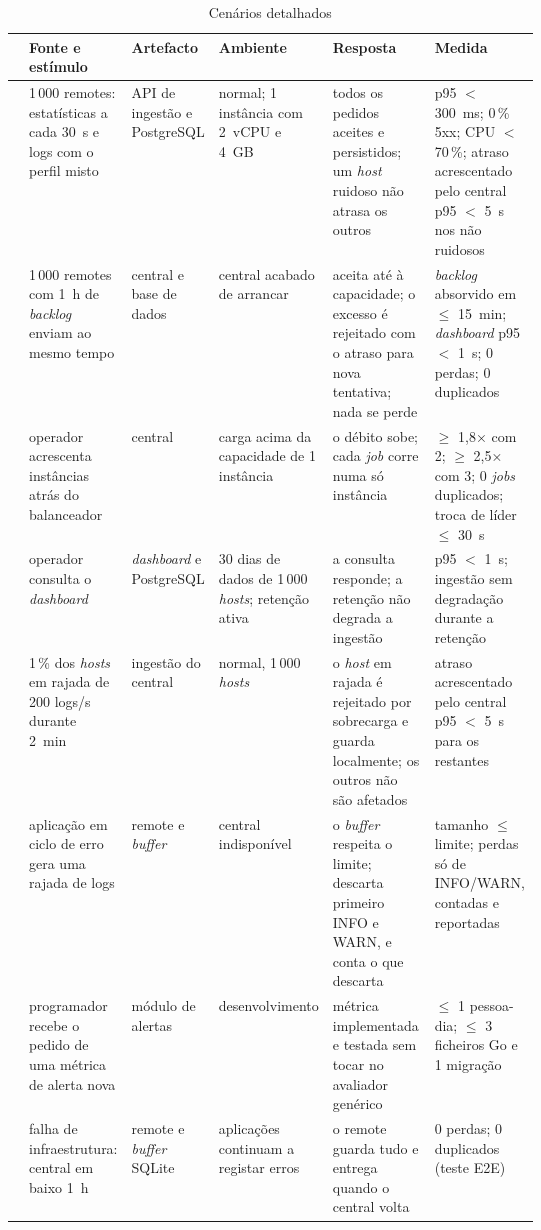 \begin{table}[htbp]
  \centering\footnotesize
  \caption{Cenários detalhados}
  \label{tab:cenarios}
  \begin{tabularx}{\linewidth}{lL{0.17\linewidth}L{0.11\linewidth}L{0.13\linewidth}YL{0.2\linewidth}}
    \toprule
    & Fonte e estímulo & Artefacto & Ambiente & Resposta & Medida \\
    \midrule
     & 1\,000 remotes: estatísticas a cada 30~s e logs com o perfil misto & API de ingestão e PostgreSQL & normal; 1 instância com 2~vCPU e 4~GB & todos os pedidos aceites e persistidos; um \emph{host} ruidoso não atrasa os outros & p95 $<$ 300~ms; 0\,\% 5xx; CPU $<$ 70\,\%; atraso acrescentado pelo central p95 $<$ 5~s nos não ruidosos \\ \addlinespace
     & 1\,000 remotes com 1~h de \emph{backlog} enviam ao mesmo tempo & central e base de dados & central acabado de arrancar & aceita até à capacidade; o excesso é rejeitado com o atraso para nova tentativa; nada se perde & \emph{backlog} absorvido em $\le$ 15~min; \emph{dashboard} p95 $<$ 1~s; 0 perdas; 0 duplicados \\ \addlinespace
     & operador acrescenta instâncias atrás do balanceador & central & carga acima da capacidade de 1 instância & o débito sobe; cada \emph{job} corre numa só instância & $\ge$ 1,8× com 2; $\ge$ 2,5× com 3; 0 \emph{jobs} duplicados; troca de líder $\le$ 30~s \\ \addlinespace
     & operador consulta o \emph{dashboard} & \emph{dashboard} e PostgreSQL & 30 dias de dados de 1\,000 \emph{hosts}; retenção ativa & a consulta responde; a retenção não degrada a ingestão & p95 $<$ 1~s; ingestão sem degradação durante a retenção \\ \addlinespace
     & 1\,\% dos \emph{hosts} em rajada de 200 logs/s durante 2~min & ingestão do central & normal, 1\,000 \emph{hosts} & o \emph{host} em rajada é rejeitado por sobrecarga e guarda localmente; os outros não são afetados & atraso acrescentado pelo central p95 $<$ 5~s para os restantes \\ \addlinespace
     & aplicação em ciclo de erro gera uma rajada de logs & remote e \emph{buffer} & central indisponível & o \emph{buffer} respeita o limite; descarta primeiro INFO e WARN, e conta o que descarta & tamanho $\le$ limite; perdas só de INFO/WARN, contadas e reportadas \\ \addlinespace
     & programador recebe o pedido de uma métrica de alerta nova & módulo de alertas & desenvolvi\-mento & métrica implementada e testada sem tocar no avaliador genérico & $\le$ 1 pessoa-dia; $\le$ 3 ficheiros Go e 1 migração \\ \addlinespace
     & falha de infraestrutura: central em baixo 1~h & remote e \emph{buffer} SQLite & aplicações continuam a registar erros & o remote guarda tudo e entrega quando o central volta & 0 perdas; 0 duplicados (teste E2E) \\
    \bottomrule
  \end{tabularx}
\end{table}


